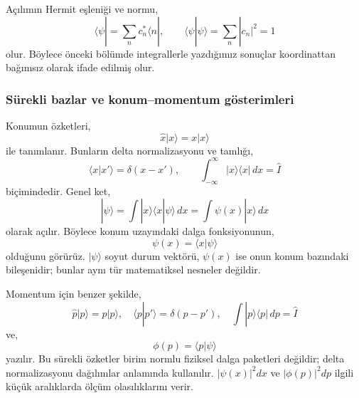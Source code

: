 \documentclass[00_kitap.tex]{subfiles}
\begin{document}
Açılımın Hermit eşleniği ve normu,
\begin{equation}
 \langle\psi|=\sum_n c_n^*\langle n|,
 \qquad\langle\psi|\psi\rangle=\sum_n|c_n|^2=1
 \label{eq:06_norm}
\end{equation}
olur. Böylece önceki bölümde integrallerle yazdığımız sonuçlar
koordinattan bağımsız olarak ifade edilmiş olur.

\subsubsection{Sürekli bazlar ve konum--momentum gösterimleri}

Konumun özketleri,
\begin{equation}
 \hat x|x\rangle=x|x\rangle
\end{equation}
ile tanımlanır. Bunların delta normalizasyonu ve tamlığı,
\begin{equation}
 \langle x|x'\rangle=\delta(x-x'),\qquad
 \boxed{\int_{-\infty}^{\infty}|x\rangle\langle x|\,dx=\hat I}
 \label{eq:06_x_tamlik}
\end{equation}
biçimindedir. Genel ket,
\begin{equation}
 |\psi\rangle=\int|x\rangle\langle x|\psi\rangle\,dx
 =\int\psi(x)|x\rangle\,dx
\end{equation}
olarak açılır. Böylece konum uzayındaki dalga fonksiyonunun,
\begin{equation}
 \boxed{\psi(x)=\langle x|\psi\rangle}
 \label{eq:06_konum_gosterimi}
\end{equation}
olduğunu görürüz. $|\psi\rangle$ soyut durum vektörü, $\psi(x)$
ise onun konum bazındaki bileşenidir; bunlar aynı tür matematiksel
nesneler değildir.

Momentum için benzer şekilde,
\begin{equation}
 \hat p|p\rangle=p|p\rangle,\quad
 \langle p|p'\rangle=\delta(p-p'),\quad
 \int|p\rangle\langle p|\,dp=\hat I
 \label{eq:06_p_tamlik}
\end{equation}
ve,
\begin{equation}
 \boxed{\phi(p)=\langle p|\psi\rangle}
\end{equation}
yazılır. Bu sürekli özketler birim normlu fiziksel dalga paketleri
değildir; delta normalizasyonu dağılımlar anlamında kullanılır.
$|\psi(x)|^2dx$ ve $|\phi(p)|^2dp$ ilgili küçük aralıklarda ölçüm
olasılıklarını verir.
\end{document}
